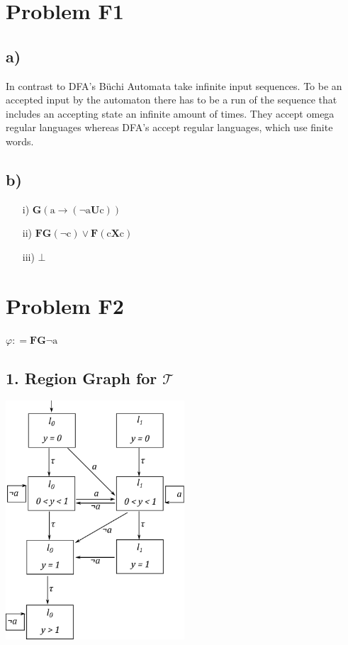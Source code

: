 \documentclass[12pt]{article}
\begin{document}
\lstset{language=C++}

\section*{Problem F1}
\subsection*{a)}
In contrast to DFA's Büchi Automata take infinite input sequences. To be an accepted input by the automaton there has to be a run of the sequence that includes an accepting state an infinite amount of times. 
They accept omega regular languages whereas DFA's accept regular languages, which use finite words.

\subsection*{b)}
\begin{itemize}
	\item[i)] $ \mathbf{G}( \text{a} \rightarrow (\neg \text{a} \mathbf{U} \text{c} ))$
	\item[ii)] $ \mathbf{F} \mathbf{G} ( \neg \text{c} ) \lor \mathbf{F} (\text{c} \mathbf{X} \text{c})  $
	\item[iii)] $ \bot $
\end{itemize}


\section*{Problem F2}

$\varphi : = \mathbf{F} \mathbf{G} \neg \text{a}$
\subsection*{1. Region Graph for $\mathcal{T}$ }

\includegraphics[width=0.5\textwidth]{images/region_graph.pdf}
\end{document}
